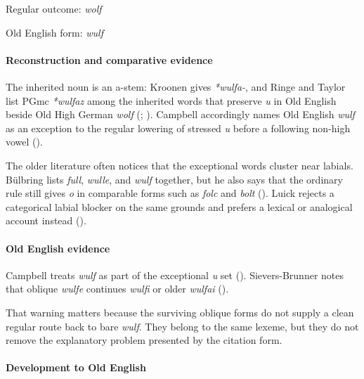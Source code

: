 \documentclass[
  british,
  a4paper,
]{article}
\begin{document}
Regular outcome: \emph{wolf}

Old English form: \emph{wulf}

\paragraph{Reconstruction and comparative
evidence}\label{reconstruction-and-comparative-evidence-75}

The inherited noun is an a-stem: Kroonen gives \emph{*wulfa-}, and Ringe
and Taylor list PGmc \emph{*wulfaz} among the inherited words that
preserve \emph{u} in Old English beside Old High German \emph{wolf}
(;
). Campbell
accordingly names Old English \emph{wulf} as an exception to the regular
lowering of stressed \emph{u} before a following non-high vowel
().

The older literature often notices that the exceptional words cluster
near labials. Bülbring lists \emph{full}, \emph{wulle}, and \emph{wulf}
together, but he also says that the ordinary rule still gives \emph{o}
in comparable forms such as \emph{folc} and \emph{bolt}
(). Luick rejects a
categorical labial blocker on the same grounds and prefers a lexical or
analogical account instead ().

\paragraph{Old English evidence}\label{old-english-evidence-75}

Campbell treats \emph{wulf} as part of the exceptional \emph{u} set
(). Sievers-Brunner
notes that oblique \emph{wulfe} continues \emph{wulfi} or older
\emph{wulfai} ().

That warning matters because the surviving oblique forms do not supply a
clean regular route back to bare \emph{wulf}. They belong to the same
lexeme, but they do not remove the explanatory problem presented by the
citation form.

\paragraph{Development to Old
English}\label{development-to-old-english-75}
\end{document}
